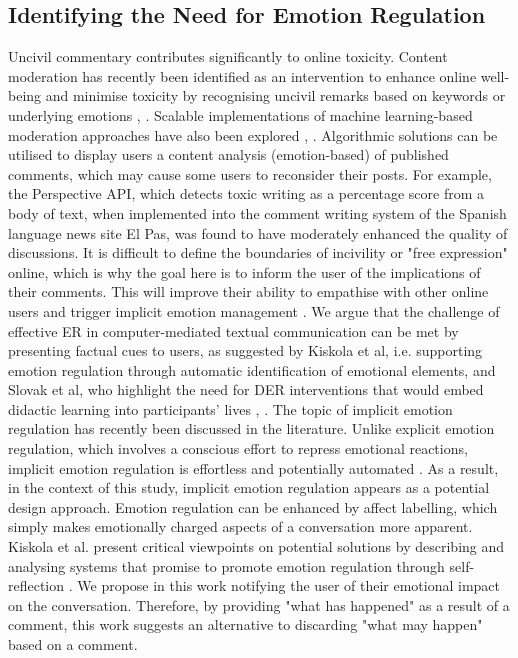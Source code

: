 \documentclass[acmtog]{acmart}
\begin{document}
\subsection{Identifying the Need for Emotion Regulation}
Uncivil commentary contributes significantly to online toxicity. Content moderation has recently been identified as an intervention to enhance online well-being and minimise toxicity by recognising uncivil remarks based on keywords or underlying emotions \cite{thomas2022s}, \cite{jhaver2021evaluating}. Scalable implementations of machine learning-based moderation approaches have also been explored \cite{gorwa2020algorithmic}, \cite{gillespie2020content}. Algorithmic solutions can be utilised to display users a content analysis (emotion-based) of published comments, which may cause some users to reconsider their posts. For example, the Perspective API, which detects toxic writing as a percentage score from a body of text, when implemented into the comment writing system of the Spanish language news site El Pas, was found to have moderately enhanced the quality of discussions. It is difficult to define the boundaries of incivility or "free expression" online, which is why the goal here is to inform the user of the implications of their comments. This will improve their ability to empathise with other online users and trigger implicit emotion management \cite{walther1993impression}. We argue that the challenge of effective ER in computer-mediated textual communication can be met by presenting factual cues to users, as suggested by Kiskola et al, i.e. supporting emotion regulation through automatic identification of emotional elements, and Slovak et al, who highlight the need for DER interventions that would embed didactic learning into participants' lives \cite{kiskola2021applying}, \cite{slovak2022designing}.  The topic of implicit emotion regulation has recently been discussed in the literature. Unlike explicit emotion regulation, which involves a conscious effort to repress emotional reactions, implicit emotion regulation is effortless and potentially automated \cite{torre2018putting}. As a result, in the context of this study, implicit emotion regulation appears as a potential design approach. Emotion regulation can be enhanced by affect labelling, which simply makes emotionally charged aspects of a conversation more apparent. Kiskola et al. present critical viewpoints on potential solutions by describing and analysing systems that promise to promote emotion regulation through self-reflection \cite{kiskola2021applying}. We propose in this work notifying the user of their emotional impact on the conversation. Therefore, by providing "what has happened" as a result of a comment, this work suggests an alternative to discarding "what may happen" based on a comment.
\end{document}
